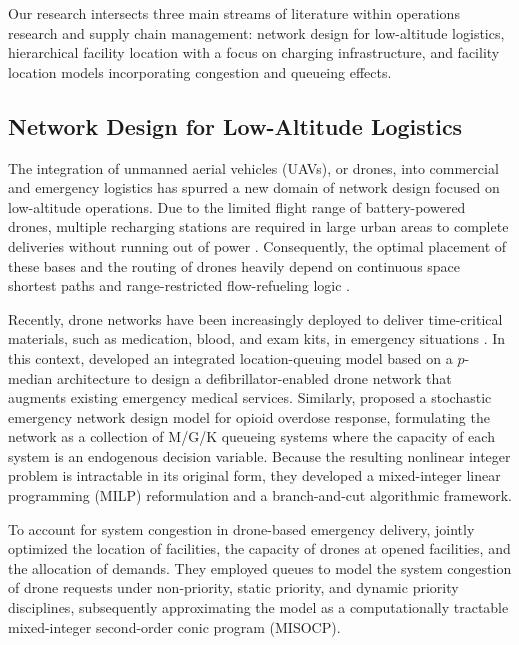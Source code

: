 \documentclass[final,3p,authoryear]{elsarticle}
\begin{document}
Our research intersects three main streams of literature within operations research and supply chain management: network design for low-altitude logistics, hierarchical facility location with a focus on charging infrastructure, and facility location models incorporating congestion and queueing effects. 

\subsection{Network Design for Low-Altitude Logistics}

The integration of unmanned aerial vehicles (UAVs), or drones, into commercial and emergency logistics has spurred a new domain of network design focused on low-altitude operations.
Due to the limited flight range of battery-powered drones, multiple recharging stations are required in large urban areas to complete deliveries without running out of power \citep{hongDeviationFlow2017AdvancesinGeocomputation}.
Consequently, the optimal placement of these bases and the routing of drones heavily depend on continuous space shortest paths and range-restricted flow-refueling logic \citep{hongRangerestrictedRechargingStation2018}.

Recently, drone networks have been increasingly deployed to deliver time-critical materials, such as medication, blood, and exam kits, in emergency situations \citep{wangFacilityLocation2022}.
In this context, \citet{boutilierDroneNetwork2022M&SOM} developed an integrated location-queuing model based on a $p$-median architecture to design a defibrillator-enabled drone network that augments existing emergency medical services.
Similarly, \citet{lejeuneDroneDeliveryNetwork2025OperationsResearch} proposed a stochastic emergency network design model for opioid overdose response, formulating the network as a collection of M/G/K queueing systems where the capacity of each system is an endogenous decision variable.
Because the resulting nonlinear integer problem is intractable in its original form, they developed a mixed-integer linear programming (MILP) reformulation and a branch-and-cut algorithmic framework.

To account for system congestion in drone-based emergency delivery, \citet{wangFacilityLocation2022} jointly optimized the location of facilities, the capacity of drones at opened facilities, and the allocation of demands.
They employed queues to model the system congestion of drone requests under non-priority, static priority, and dynamic priority disciplines, subsequently approximating the model as a computationally tractable mixed-integer second-order conic program (MISOCP).
\end{document}
